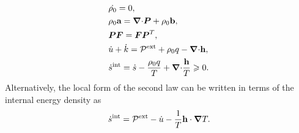 \begin{subequations}
  \begin{align}
     & \dot{\rho_0} = 0,                                                                                                                \\
     & \rho_0 \textbf{a} = {\boldsymbol{\nabla} \cdot} \boldsymbol{P} + \rho_0\textbf{b},                                                                                     \\
     & \boldsymbol{P}\boldsymbol{F} = \boldsymbol{F}\boldsymbol{P}^T,                                                                                                   \\
     & \dot{u} + \dot{k} = \mathcal{P}^\text{ext} + \rho_0 q - {\boldsymbol{\nabla} \cdot} \textbf{h},                                                        \\
     & \dot{s}^\text{int} = \dot{s} - \dfrac{\rho_0 q}{T} + {\boldsymbol{\nabla} \cdot} \dfrac{\textbf{h}}{T} \geqslant 0. \label{eq: dissipation inequality} 
  \end{align}
\end{subequations}
Alternatively, the local form of the second law can be written in terms of the internal energy density as
\begin{align}
  \dot{s}^\text{int} = \mathcal{P}^\text{ext} - \dot{u} - \dfrac{1}{T} \textbf{h} \cdot \boldsymbol{\nabla} T. \label{eq: dissipation inequality 2}
\end{align}


